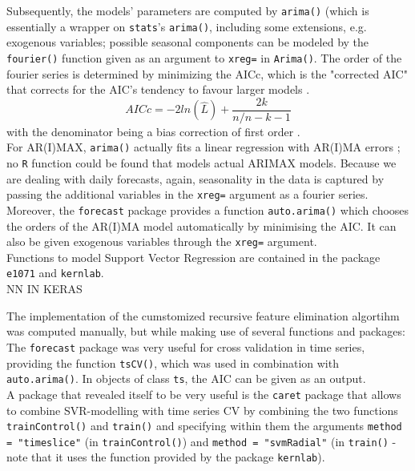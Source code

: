 \documentclass[a4paper, 11pt]{article}
\begin{document}
Subsequently, the models' parameters are computed by \texttt{arima()} (which is essentially a wrapper on \texttt{stats}'s \texttt{arima()}, including some extensions, e.g. exogenous variables; possible seasonal components can be modeled by the \texttt{fourier()} function given as an argument to \texttt{xreg=} in \texttt{Arima()}. The order of the fourier series is determined by minimizing the AICc, which is the "corrected AIC" that corrects for the AIC's tendency to favour larger models \citep{Wit.2012}. \\
\begin{equation}
AICc = -2ln(\hat{L})+\frac{2k}{n/n-k-1}
\end{equation}
with the denominator being a bias correction of first order \citep{Wit.2012}.\\
For AR(I)MAX, \texttt{arima()} actually fits a linear regression with AR(I)MA errors \citep{Hyndman.2018}; no \texttt{R} function could be found that models actual ARIMAX models. Because we are dealing with daily forecasts, again, seasonality in the data is captured by passing the additional variables in the \texttt{xreg=} argument as a fourier series.
Moreover, the \texttt{forecast} package provides a function \texttt{auto.arima()} which chooses the orders of the AR(I)MA model automatically by minimising the AIC. It can also be given exogenous variables through the \texttt{xreg=} argument.\\

Functions to model Support Vector Regression are contained in the package \texttt{e1071} and \texttt{kernlab}.\\

NN IN KERAS

The implementation of the cumstomized recursive feature elimination algortihm was computed manually, but while making use of several functions and packages:
The \texttt{forecast} package was very useful for cross validation in time series, providing the function \texttt{tsCV()}, which was used in combination with \texttt{auto.arima()}. In objects of class \texttt{ts}, the AIC can be given as an output. \\ 
A package that revealed itself to be very useful is the \texttt{caret} package that allows to combine SVR-modelling with time series CV by combining the two functions \texttt{trainControl()} and \texttt{train()} and specifying within them the arguments \texttt{method = "timeslice"} (in \texttt{trainControl()}) and \texttt{method = "svmRadial"} (in \texttt{train()} - note that it uses the function provided by the package \texttt{kernlab}).
\end{document}
